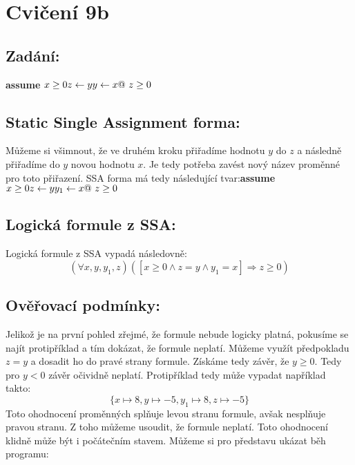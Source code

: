\documentclass{article}
\begin{document}
\section{Cvičení 9b}

\subsection{Zadání:}
    \textbf{assume} $x \geq 0 \newline z \leftarrow y \newline y \leftarrow x \newline @ \ z \geq 0$
    

\subsection{Static Single Assignment forma:}

Můžeme si všimnout, že ve druhém kroku přiřadíme hodnotu $y$ do $z$ a následně přiřadíme do $y$ novou hodnotu $x$. Je tedy potřeba  zavést nový název proměnné pro toto přiřazení. SSA forma má tedy následující tvar:\newline\newline \textbf{assume} $x \geq 0 \newline z \leftarrow y \newline y_1 \leftarrow x \newline @ \ z \geq 0$


\subsection{Logická formule z SSA:}
Logická formule z SSA vypadá následovně:
$$(\forall x, y, y_1, z )([ x \geq 0 \wedge z = y \wedge y_1 = x ] \Rightarrow z \geq 0) $$


\subsection{Ověřovací podmínky:}
Jelikož je na první pohled zřejmé, že formule nebude logicky platná, pokusíme se najít protipříklad a tím dokázat, že formule neplatí. Můžeme využít předpokladu $z = y$ a dosadit ho do pravé strany formule. Získáme tedy závěr, že $y \geq 0$. Tedy pro $y < 0$ závěr očividně neplatí. Protipříklad tedy může vypadat například takto:
$$\{x \mapsto 8, y \mapsto -5, y_1 \mapsto 8, z \mapsto -5 \}$$
Toto ohodnocení proměnných splňuje levou stranu formule, avšak nesplňuje pravou stranu. Z toho můžeme usoudit, že formule neplatí. Toto ohodnocení klidně může být i počátečním stavem. Můžeme si pro představu ukázat běh programu:
\end{document}
